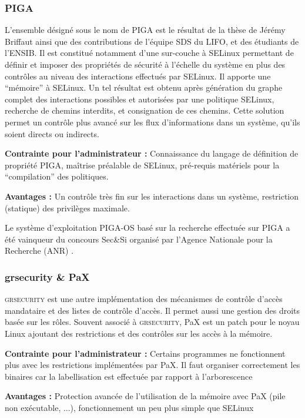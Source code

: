 \subsubsection{PIGA}

L'ensemble désigné sous le nom de PIGA est le résultat de la thèse de Jérémy Briffaut ainsi que des contributions de l'équipe SDS du LIFO, et des étudiants de l'ENSIB. Il est constitué notamment d'une sur-couche à SELinux permettant de définir et imposer des propriétés de sécurité à l'échelle du système en plus des contrôles au niveau des interactions effectués par SELinux. Il apporte une ``mémoire'' à SELinux. Un tel résultat est obtenu après génération du graphe complet des interactions possibles et autorisées par une politique SELinux, recherche de chemins interdits, et consignation de ces chemins. Cette solution permet un contrôle plus avancé sur les flux d'informations dans un système, qu'ils soient directs ou indirects.
\begin{list}{}{}
 \item \textbf{Contrainte pour l'administrateur :} Connaissance du langage de définition de propriété PIGA, maîtrise préalable de SELinux, pré-requis matériels pour la ``compilation'' des politiques.
 \item \textbf{Avantages :} Un contrôle très fin sur les interactions dans un système, restriction (statique) des privilèges maximale.
\end{list}

Le système d'exploitation PIGA-OS basé sur la recherche effectuée sur PIGA a été vainqueur du concours Sec\&Si organisé par l'Agence Nationale pour la Recherche (ANR) \cite{PIGA}\cite{PIGA2}.

\subsubsection{grsecurity \& PaX}

\textsc{grsecurity} est une autre implémentation des mécanismes de contrôle d'accès mandataire et des listes de contrôle d'accès. Il permet aussi une gestion des droits basée sur les rôles. Souvent associé à \textsc{grsecurity}, PaX est un patch pour le noyau Linux ajoutant des restrictions et des contrôles sur les accès à la mémoire.
\begin{list}{}{}
 \item \textbf{Contrainte pour l'administrateur :} Certains programmes ne fonctionnent plus avec les restrictions implémentées par PaX. Il faut organiser correctement les binaires car la labellisation est effectuée par rapport à l'arborescence
 \item \textbf{Avantages :} Protection avancée de l'utilisation de la mémoire avec PaX (pile non exécutable, ...), fonctionnement un peu plus simple que SELinux
\end{list}

